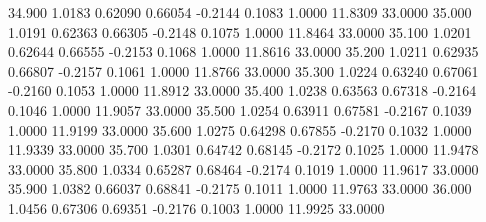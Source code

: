   34.900   1.0183   0.62090   0.66054  -0.2144   0.1083   1.0000  11.8309  33.0000
  35.000   1.0191   0.62363   0.66305  -0.2148   0.1075   1.0000  11.8464  33.0000
  35.100   1.0201   0.62644   0.66555  -0.2153   0.1068   1.0000  11.8616  33.0000
  35.200   1.0211   0.62935   0.66807  -0.2157   0.1061   1.0000  11.8766  33.0000
  35.300   1.0224   0.63240   0.67061  -0.2160   0.1053   1.0000  11.8912  33.0000
  35.400   1.0238   0.63563   0.67318  -0.2164   0.1046   1.0000  11.9057  33.0000
  35.500   1.0254   0.63911   0.67581  -0.2167   0.1039   1.0000  11.9199  33.0000
  35.600   1.0275   0.64298   0.67855  -0.2170   0.1032   1.0000  11.9339  33.0000
  35.700   1.0301   0.64742   0.68145  -0.2172   0.1025   1.0000  11.9478  33.0000
  35.800   1.0334   0.65287   0.68464  -0.2174   0.1019   1.0000  11.9617  33.0000
  35.900   1.0382   0.66037   0.68841  -0.2175   0.1011   1.0000  11.9763  33.0000
  36.000   1.0456   0.67306   0.69351  -0.2176   0.1003   1.0000  11.9925  33.0000
